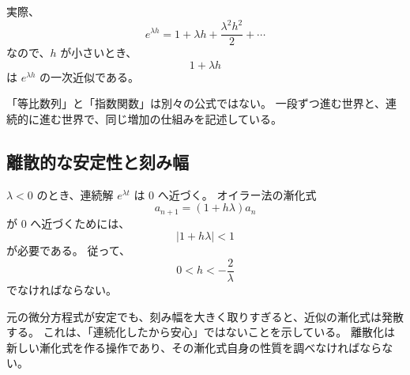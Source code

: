 実際、
\[
  e^{\lambda h}
  =1+\lambda h+\frac{\lambda^2h^2}{2}+\cdots
\]
なので、$h$ が小さいとき、
\[
  1+\lambda h
\]
は $e^{\lambda h}$ の一次近似である。

「等比数列」と「指数関数」は別々の公式ではない。
一段ずつ進む世界と、連続的に進む世界で、同じ増加の仕組みを記述している。

\subsection{離散的な安定性と刻み幅}

$\lambda<0$ のとき、連続解 $e^{\lambda t}$ は $0$ へ近づく。
オイラー法の漸化式
\[
  a_{n+1}=(1+h\lambda)a_n
\]
が $0$ へ近づくためには、
\[
  |1+h\lambda|<1
\]
が必要である。
従って、
\[
  0<h<-\frac2\lambda
\]
でなければならない。

元の微分方程式が安定でも、刻み幅を大きく取りすぎると、近似の漸化式は発散する。
これは、「連続化したから安心」ではないことを示している。
離散化は新しい漸化式を作る操作であり、その漸化式自身の性質を調べなければならない。

